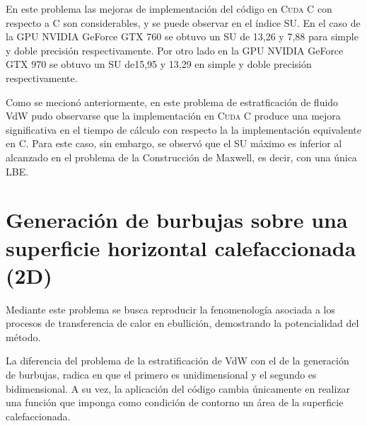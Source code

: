 En este problema las mejoras de implementación del código en \textsc{Cuda C} con respecto a \textsc{C} son considerables, y se puede observar en el índice SU. En el caso de la GPU NVIDIA GeForce GTX 760 se obtuvo un SU de 13,26 y 7,88 para simple y doble precisión respectivamente. Por otro lado en la GPU NVIDIA GeForce GTX 970 se obtuvo un SU de15,95 y 13,29 en simple y doble precisión respectivamente.

Como se mecionó anteriormente, en este problema de estratficación de fluido VdW pudo observarse que la implementación en \textsc{Cuda C} produce una mejora significativa en el tiempo de cálculo con respecto la la implementación equivalente en \textsc{C}. Para este caso, sin embargo, se observó que el SU máximo es inferior al alcanzado en el problema de la Construcción de Maxwell, es decir, con una única LBE.

\newpage
\newpage
\section{Generación de burbujas sobre una superficie horizontal calefaccionada (2D)}

Mediante este problema se busca reproducir la fenomenología asociada a los procesos de transferencia de calor en ebullición, demostrando la potencialidad del método. 

La diferencia del problema de la estratificación de VdW con el de la generación de burbujas, radica en que el primero es unidimensional y el segundo es bidimensional. A su vez, la aplicación del código cambia únicamente en realizar una función que imponga como condición de contorno un área de la superficie calefaccionada.


